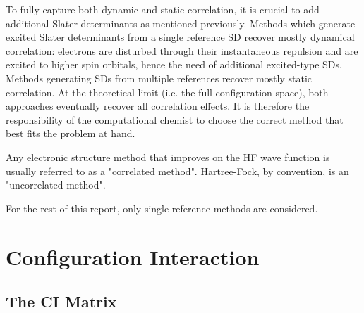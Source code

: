 To fully capture both dynamic and static correlation, it is crucial to add additional Slater determinants as mentioned previously. Methods which generate excited Slater determinants from a single reference SD recover mostly dynamical correlation: electrons are disturbed through their instantaneous repulsion and are excited to higher spin orbitals, hence the need of additional excited-type SDs. Methods generating SDs from multiple references recover mostly static correlation. At the theoretical limit (i.e. the full configuration space), both approaches eventually recover all correlation effects. It is therefore the responsibility of the computational chemist to choose the correct method that best fits the problem at hand.

Any electronic structure method that improves on the HF wave function is usually referred to as a "correlated method". Hartree-Fock, by convention, is an "uncorrelated method". 

For the rest of this report, only single-reference methods are considered.

\section{Configuration Interaction}

\subsection{The CI Matrix}

